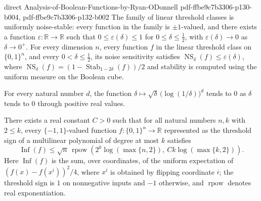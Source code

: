 \begin{theorem}
  {direct}
  {Analysis-of-Boolean-Functions-by-Ryan-ODonnell}
  {pdf-ffbe9c7b3306-p130-b004,
    pdf-ffbe9c7b3306-p132-b002}
The family of linear threshold classes is uniformly noise-stable: every function in the
family is $\pm 1$-valued, and there exists a function $\varepsilon:\mathbb R\to\mathbb
R$ such that $0\leq\varepsilon(\delta)\leq1$ for $0\leq\delta\leq\tfrac12$, with
$\varepsilon(\delta)\to0$ as $\delta\to0^+$. For every dimension $n$, every function $f$
in the linear threshold class on $\{0,1\}^n$, and every $0<\delta\leq\tfrac12$, its
noise sensitivity satisfies $\operatorname{NS}_{\delta}(f)\leq\varepsilon(\delta)$,
where $\operatorname{NS}_{\delta}(f)=(1-\operatorname{Stab}_{1-2\delta}(f))/2$ and
stability is computed using the uniform measure on the Boolean cube.
\end{theorem}

\begin{lemma}
\leanok
{}
For every natural number $d$, the function $\delta\mapsto
\sqrt{\delta}\,\bigl(\log(1/\delta)\bigr)^d$ tends to $0$ as $\delta$ tends to $0$
through positive real values.
\end{lemma}

\begin{theorem}
\leanok
{}
There exists a real constant $C>0$ such that for all natural numbers $n,k$ with $2\le
k$, every $\{-1,1\}$-valued function $f:\{0,1\}^n\to\mathbb R$ represented as the
threshold sign of a multilinear polynomial of degree at most $k$ satisfies
\[\operatorname{Inf}(f)\le\sqrt n\,\operatorname{rpow}\!\left(2^k\log(\max\{n,2\}),\ Ck\log(\max\{k,2\})\right).\]
Here $\operatorname{Inf}(f)$ is the sum, over coordinates, of the uniform expectation of
$(f(x)-f(x^i))^2/4$, where $x^i$ is obtained by flipping coordinate $i$; the threshold
sign is $1$ on nonnegative inputs and $-1$ otherwise, and $\operatorname{rpow}$ denotes
real exponentiation.
\end{theorem}

